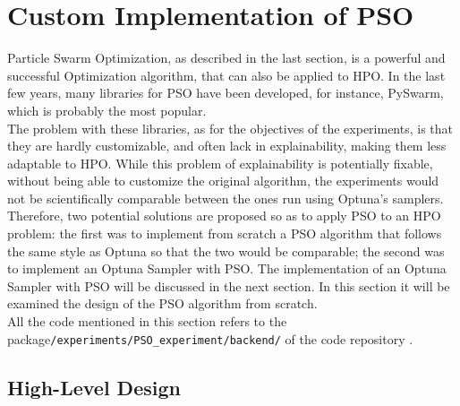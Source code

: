 \section{Custom Implementation of PSO}\label{sec:CustomImplementationOfPSO-3.2}

Particle Swarm Optimization, as described in the last section, is a powerful and successful Optimization algorithm, that can also be applied to HPO.
In the last few years, many libraries for PSO have been developed, for instance, PySwarm, which is probably the most popular.
\\[0.3cm]The problem with these libraries, as for the objectives of the experiments, is that they are hardly customizable, and often lack in explainability, making them less adaptable to HPO.
While this problem of explainability is potentially fixable, without being able to customize the original algorithm, the experiments would not be scientifically comparable between the ones run using Optuna's samplers.
\\[0.3cm]Therefore, two potential solutions are proposed so as to apply PSO to an HPO problem: the first was to implement from scratch a PSO algorithm that follows the same style as Optuna so that the two would be comparable; the second was to implement an Optuna Sampler with PSO.
The implementation of an Optuna Sampler with PSO will be discussed in the next section. In this section it will be examined the design of the PSO algorithm from scratch.
\\[0.3cm]All the code mentioned in this section refers to the package\newline\texttt{/experiments/PSO\_experiment/backend/} of the code repository \cite{Repository-THESIS}.

\subsection{High-Level Design}

